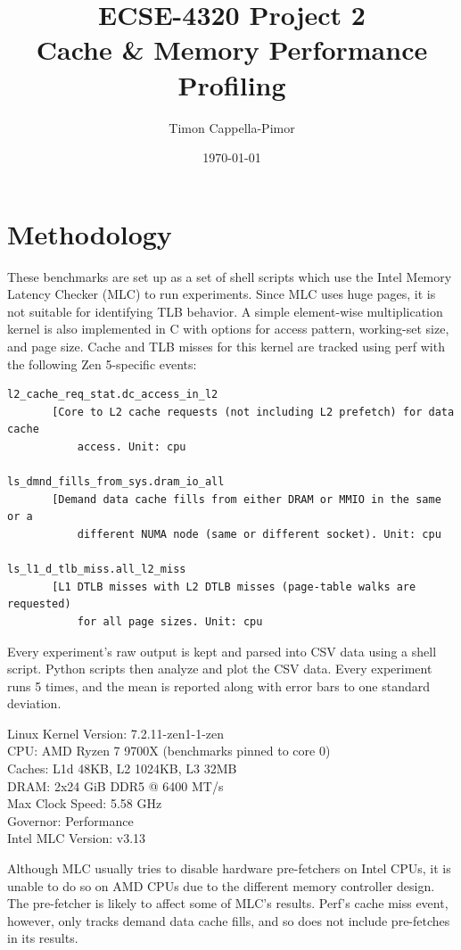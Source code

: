 \documentclass[12pt]{article}
\title{ECSE-4320 Project 2 \\ \large Cache \& Memory Performance Profiling}
\author{Timon Cappella-Pimor}
\date{\today}
\begin{document}
\maketitle
\newpage
\section*{Methodology}

These benchmarks are set up as a set of shell scripts which use the Intel
Memory Latency Checker (MLC) to run experiments. Since MLC uses huge pages, it
is not suitable for identifying TLB behavior. A simple element-wise
multiplication kernel is also implemented in C with options for access pattern,
working-set size, and page size. Cache and TLB misses for this kernel are
tracked using perf with the following Zen 5-specific events:
\begin{verbatim}
l2_cache_req_stat.dc_access_in_l2
       [Core to L2 cache requests (not including L2 prefetch) for data cache
           access. Unit: cpu

ls_dmnd_fills_from_sys.dram_io_all
       [Demand data cache fills from either DRAM or MMIO in the same or a
           different NUMA node (same or different socket). Unit: cpu

ls_l1_d_tlb_miss.all_l2_miss
       [L1 DTLB misses with L2 DTLB misses (page-table walks are requested)
           for all page sizes. Unit: cpu
\end{verbatim}
Every experiment's raw output is kept and parsed into CSV data using a shell
script. Python scripts then analyze and plot the CSV data. Every experiment
runs 5 times, and the mean is reported along with error bars to one standard
deviation.

Linux Kernel Version: 7.2.11-zen1-1-zen \\
CPU: AMD Ryzen 7 9700X (benchmarks pinned to core 0) \\
Caches: L1d 48KB, L2 1024KB, L3 32MB \\
DRAM: 2x24 GiB DDR5 @ 6400 MT/s \\
Max Clock Speed: 5.58 GHz \\
Governor: Performance \\
Intel MLC Version: v3.13

Although MLC usually tries to disable hardware pre-fetchers on Intel CPUs, it
is unable to do so on AMD CPUs due to the different memory controller design.
The pre-fetcher is likely to affect some of MLC's results. Perf's cache miss
event, however, only tracks demand data cache fills, and so does not include
pre-fetches in its results.
\end{document}
